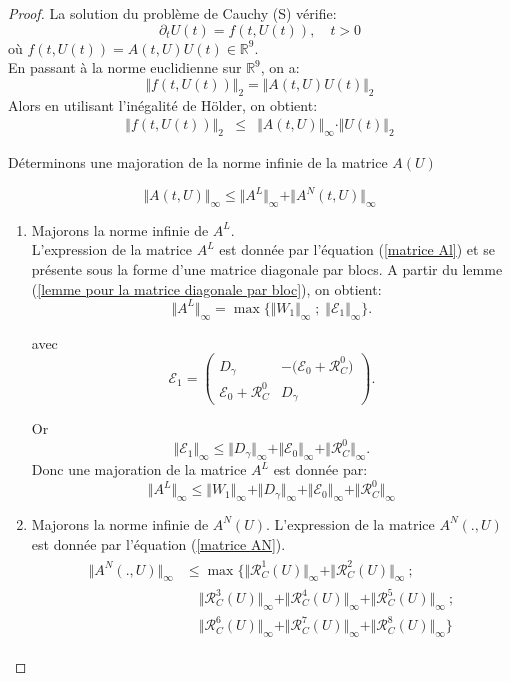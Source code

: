 \documentclass[12pt,a4paper,openany,oneside]{book}
\begin{document}
{{{{{{\begin{proof}
La solution du problème de Cauchy (S) vérifie:
$$ \partial_{t}U(t) = \mbox{$f(t,U(t)),\quad t>0$} $$
où $f(t,U(t))= A(t,U)U(t)\in \mathbb{R}^{9}$.\\
En passant à la norme euclidienne sur $\mathbb{R}^{9}$, on a:
$$\Vert f(t,U(t))\Vert_{2}= \Vert A(t,U)U(t)\Vert_{2}$$
Alors en utilisant l'inégalité de H\"{o}lder, on obtient:
\begin{eqnarray*}
\Vert f(t,U(t))\Vert_{2}& \leq & \Vert A(t,U)\Vert_{\infty}\cdot\Vert U(t)\Vert_{2}
\end{eqnarray*}

Déterminons une majoration de la norme infinie de la matrice $A(U)$

 $$ \Vert A(t,U)\Vert_{\infty} \leq \Vert A^{L}\Vert_{\infty} + \Vert A^{N}(t,U)\Vert_{\infty}$$ 
 \begin{enumerate}
 \item Majorons la norme infinie de $ A^{L}$.\\
 L'expression de la matrice $ A^{L}$ est donnée par l'équation (\ref{matrice Al}) et se présente sous la forme d'une matrice diagonale par blocs. A partir du lemme (\ref{lemme pour la matrice diagonale par bloc}), on obtient:
 $$ \Vert A^{L} \Vert_{\infty}=\max\{\Vert W_{1} \Vert_{\infty} \; ; \; \Vert \mathcal{E}_{1} \Vert_{\infty}\} .$$
 
 avec $$ \mathcal{E}_{1}= \begin{pmatrix}
 D_{\gamma}                &  -\big(\mathcal{E}_{0}+\mathcal{R}^{0}_{C}\big)  \\
\mathcal{E}_{0}+ \mathcal{R}^{0}_{C}  &  D_{\gamma}
\end{pmatrix}. $$

Or $$\Vert \mathcal{E}_{1}\Vert_{\infty} \leq \Vert D_{\gamma} \Vert_{\infty}+\Vert \mathcal{E}_{0}\Vert_{\infty}+ \Vert \mathcal{R}^{0}_{C} \Vert_{\infty} .$$
 Donc une majoration de la matrice $ A^{L} $ est donnée par:
 $$\Vert A^{L}\Vert_{\infty} \leq  \Vert W_{1} \Vert_{\infty}+\Vert D_{\gamma} \Vert_{\infty}+\Vert \mathcal{E}_{0}\Vert_{\infty}+ \Vert \mathcal{R}^{0}_{C} \Vert_{\infty} $$
  
\item Majorons la norme infinie de $ A^{N}(U)$.
L'expression de la matrice $ A^{N}(.,U)$ est donnée par l'équation (\ref{matrice AN}).
\begin{eqnarray*}
\begin{split}
 \Vert A^{N}(.,U) \Vert_{\infty} & \leq \max \Big\{\Vert \mathcal{R}^{1}_{C}(U)\Vert_{\infty}+\Vert \mathcal{R}^{2}_{C}(U)\Vert_{\infty}\: ;\\
 &\quad \Vert \mathcal{R}^{3}_{C}(U)\Vert_{\infty}+\Vert \mathcal{R}^{4}_{C}(U)\Vert_{\infty}+\Vert \mathcal{R}^{5}_{C}(U)\Vert_{\infty}\: ; \\
 &\quad \Vert \mathcal{R}^{6}_{C}(U)\Vert_{\infty}+\Vert \mathcal{R}^{7}_{C}(U)\Vert_{\infty}+\Vert \mathcal{R}^{8}_{C}(U)\Vert_{\infty} \Big\} 
 \end{split}
 \end{eqnarray*}


\end{enumerate}
\end{proof}}}}}}}
\end{document}
